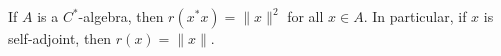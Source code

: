 If $A$ is a $C^*$-algebra, then $r(x^*x) = \|x\|^2$ for all $x \in A$. In particular, if $x$ is self-adjoint, then $r(x) = \|x\|$.
